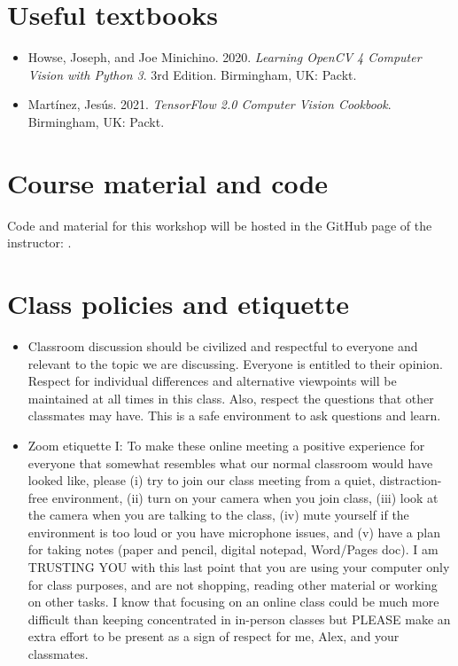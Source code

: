 \documentclass[11pt]{article}
\begin{document}
\begin{flushleft}
\section{Useful textbooks}\label{required-texts-and-materials}
\begin{itemize}
    \item Howse, Joseph, and Joe Minichino. 2020. \emph{Learning OpenCV 4 Computer Vision with Python 3}. 3rd Edition. Birmingham, UK: Packt.
    \item Mart\'{i}nez, Jes\'{u}s. 2021. \emph{TensorFlow 2.0 Computer Vision Cookbook}. Birmingham, UK: Packt.
\end{itemize}


\section{Course material and code}
Code and material for this workshop will be hosted in the GitHub page of the instructor: .


\section{Class policies and etiquette}
\begin{itemize}
    \item Classroom discussion should be civilized and respectful to everyone and relevant to the topic we are discussing. Everyone is entitled to their opinion. Respect for individual differences and alternative viewpoints will be maintained at all times in this class. Also, respect the questions that other classmates may have. This is a safe environment to ask questions and learn.

    \item Zoom etiquette I: To make these online meeting a positive experience for everyone that somewhat resembles what our normal classroom would have looked like, please (i) try to join our class meeting from a quiet, distraction-free environment, (ii) turn on your camera when you join class, (iii) look at the camera when you are talking to the class, (iv) mute yourself if the environment is too loud or you have microphone issues, and (v) have a plan for taking notes (paper and pencil, digital notepad, Word/Pages doc). I am TRUSTING YOU with this last point that you are using your computer only for class purposes, and are not shopping, reading other material or working on other tasks. I know that focusing on an online class could be much more difficult than keeping concentrated in in-person classes but PLEASE make an extra effort to be present as a sign of respect for me, Alex, and your classmates.
\end{itemize}

\end{flushleft}
\end{document}
